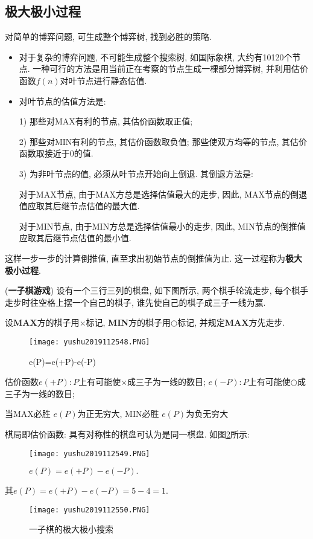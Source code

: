 \subsection{极大极小过程}
对简单的博弈问题, 可生成整个博弈树, 找到必胜的策略.
\begin{itemize}
\item 对于复杂的博弈问题, 不可能生成整个搜索树, 如国际象棋, 大约有10120个节点.  一种可行的方法是用当前正在考察的节点生成一棵部分博弈树, 并利用估价函数$f(n)$对叶节点进行静态估值.
\item 对叶节点的估值方法是:

1) 那些对MAX有利的节点, 其估价函数取正值;

2) 那些对MIN有利的节点, 其估价函数取负值; 那些使双方均等的节点, 其估价函数取接近于0的值.

3) 为非叶节点的值, 必须从叶节点开始向上倒退. 其倒退方法是:

   \qquad{} 对于MAX节点, 由于MAX方总是选择估值最大的走步, 因此, MAX节点的倒退值应取其后继节点估值的最大值.

   \qquad{} 对于MIN节点, 由于MIN方总是选择估值最小的走步, 因此, MIN节点的倒推值应取其后继节点估值的最小值.
\end{itemize}
这样一步一步的计算倒推值, 直至求出初始节点的倒推值为止. 这一过程称为\textbf{极大极小过程}.
\begin{example}
    (\textbf{一子棋游戏}) 设有一个三行三列的棋盘, 如下图所示, 两个棋手轮流走步, 每个棋手走步时往空格上摆一个自己的棋子, 谁先使自己的棋子成三子一线为赢.
\end{example}

设\textbf{MAX}方的棋子用$\times$标记, \textbf{MIN}方的棋子用$○$标记, 并规定\textbf{MAX}方先走步.
\begin{figure}[H]
\centering
\texttt{[image: yushu2019112548.PNG]}
\caption{e(P)=e(+P)-e(-P)}
\label{AI32fig48}
\end{figure}
\begin{result}
估价函数$e(+P): P$上有可能使$\times$成三子为一线的数目; $e(-P): P$上有可能使$○$成三子为一线的数目;

当\textup{MAX}必胜 $e(P)$为正无穷大, \textup{MIN}必胜 $e(P)$为负无穷大

棋局即估价函数: 具有对称性的棋盘可认为是同一棋盘. 如图\ref{AI32fig49}所示:
\begin{figure}[H]
\centering
\texttt{[image: yushu2019112549.PNG]}
\caption{$e(P)=e(+P)-e(-P).$}
\label{AI32fig49}
\end{figure}
其$e(P)=e(+P)-e(-P)=5-4=1$.
\end{result}
\begin{figure}[H]
\centering
\texttt{[image: yushu2019112550.PNG]}
\caption{一子棋的极大极小搜索}
\label{AI32fig50}
\end{figure}
